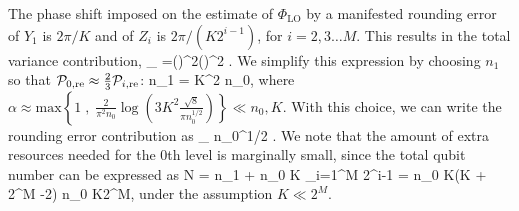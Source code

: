 The phase shift imposed on the estimate of $\Phi_\mathrm{LO}$ by a
manifested rounding error of $Y_1$ is $2\pi/K$ and of $Z_{i}$ is $2\pi/
(K 2^{i-1})$, for $i=2,3\dots M$.
This
results in the total variance contribution,
\bel
	_ 
	=\left(\right)^2\left[\PP_{0,\mathrm{re}} +
	\sum_{i=2}^{M}\PP_{i-1,\mathrm{re}} (2^{-i+1})^2\right]
	\approx\left(\right)^2
	.
\eel
We simplify this expression by choosing $n_1$ so that  $\mathcal{P}_{0,\mathrm{re}}
\approx \frac{2}{3} \mathcal{P}_{i,\mathrm{re}}$:
\bel
	n_1 = \alpha K^2 n_0,
\eel
where $\alpha \approx \mathrm{max}\left\{1\;,\; \frac{2}{\pi^2 n_0}
\log\left(3K^2\frac{\sqrt{8}}{\pi n_0^{1/2}}\right)\right\} \ll n_0,
K$.
With this choice, we can write the rounding error contribution as
\bel
	\label{eq:Rounding_GHZ 2}
	_ \approx {}
	n_0^{1/2} \exp{}.
\eel
We note that the amount of extra resources needed for the 0th level is
marginally small, since the total qubit number can be expressed as
\bel
	N = n_1 + n_0 K \sum_{i=1}^M 2^{i-1} = n_0 K(\alpha K + 2^{M} -2) \approx
	n_0 K2^{M},
\eel
under the assumption $K \ll 2^{M}$.

